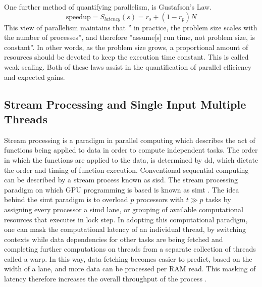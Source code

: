 One further method of quantifying parallelism, is Gustafson's Law\cite{Gustafson}.
%
\begin{equation}
  \tag{Gustofson's Law}
  \text{speedup} = S_{latency}(s) = r_{s} + (1 - r_{p})N
\end{equation}
%
This view of parallelism maintains that '' in practice, the problem
size scales with the number of processes'', and therefore
''assume[s] run time, not problem size, is constant''.
In other words, as the problem size grows, a proportional
amount of resources should be devoted to keep the execution time constant.  This
is called weak scaling.
Both of these laws assist in the quantification of parallel efficiency and
expected gains.

\subsection{Stream Processing and Single Input Multiple Threads}
Stream processing is a paradigm in parallel computing which describes the act
of functions being applied to data in order to compute independent tasks.
The order in which the functions are applied to the data, is determined by
\gls{dd}, which dictate the order and timing of function execution. Conventional
sequential computing can be described by a stream process known as \gls{sisd}.
The stream processing paradigm on which GPU programming is based is known as \gls{simt}
\cite{advancedtopics}.  The idea behind the \gls{simt} paradigm is to overload
$p$ processors with $t \gg p$ tasks by assigning every processor a \gls{simd} lane, or
grouping of available computational resources
that executes in lock step.  In adopting this computational paradigm, one can mask
the computational latency of an individual thread, by switching contexts while
data dependencies for other tasks are being fetched and
completing further computations on threads from a separate collection of threads called a warp.  In this way,
data fetching becomes easier to predict, based on the width of a lane, and more
data can be processed per \gls{RAM} read.   This masking of latency therefore increases
the overall throughput of the process \cite{advancedtopics}.


